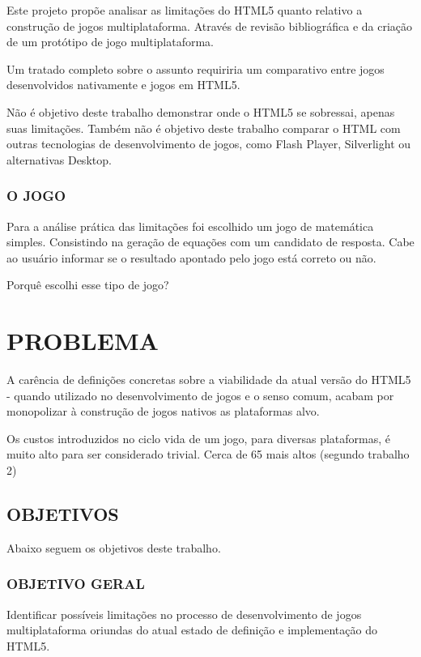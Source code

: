 \documentclass[11pt,a4paper]{article}
\begin{document}
Este projeto propõe analisar as limitações do HTML5 quanto relativo
a construção de jogos multiplataforma. Através de revisão
bibliográfica e da criação de um protótipo de jogo multiplataforma.

Um tratado completo sobre o assunto requiriria um comparativo entre
jogos desenvolvidos nativamente e jogos em HTML5.

Não é objetivo deste trabalho demonstrar onde o HTML5 se sobressai,
apenas suas limitações. Também não é objetivo deste trabalho
comparar o HTML com outras
tecnologias de desenvolvimento de jogos, como Flash Player, Silverlight
ou alternativas Desktop.

\subsection{O JOGO}

Para a análise prática das limitações foi escolhido um jogo de
matemática simples. Consistindo na geração de equações com um
candidato de resposta. Cabe ao usuário informar se o resultado apontado
pelo jogo está correto ou não.

Porquê escolhi esse tipo de jogo?

\chapter{PROBLEMA}
A carência de definições concretas sobre a viabilidade da atual
versão do HTML5 - quando utilizado no desenvolvimento de jogos e o
senso comum, acabam por monopolizar à construção de jogos nativos as
plataformas alvo.

Os custos introduzidos no ciclo vida de um jogo, para diversas
plataformas, é muito alto para ser considerado trivial. Cerca de 65%
mais altos (segundo trabalho 2)

\section{ OBJETIVOS}

Abaixo seguem os objetivos deste trabalho.

\subsection{  OBJETIVO GERAL}

Identificar possíveis limitações no processo de desenvolvimento
de jogos multiplataforma oriundas do atual estado de definição e
implementação do HTML5.
\end{document}
